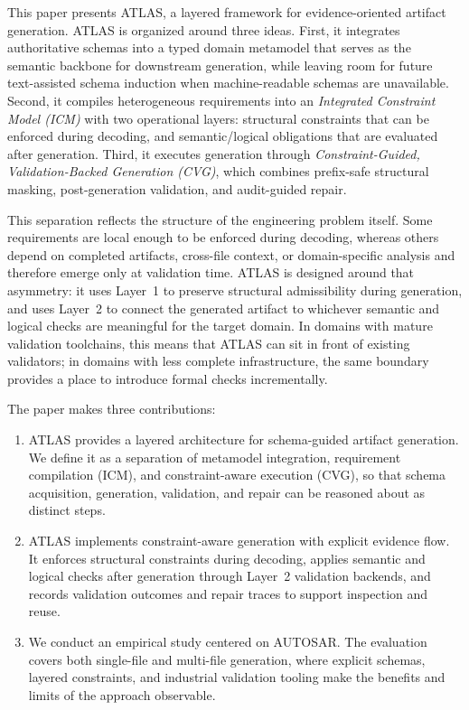 \documentclass[acmlarge,nonacm]{acmart}
\theoremstyle{acmplain}
\theoremstyle{acmdefinition}
\begin{document}
This paper presents ATLAS, a layered framework for evidence-oriented artifact generation. ATLAS is organized around three ideas. First, it integrates authoritative schemas into a typed domain metamodel that serves as the semantic backbone for downstream generation, while leaving room for future text-assisted schema induction when machine-readable schemas are unavailable. Second, it compiles heterogeneous requirements into an \emph{Integrated Constraint Model (ICM)} with two operational layers: structural constraints that can be enforced during decoding, and semantic/logical obligations that are evaluated after generation. Third, it executes generation through \emph{Constraint-Guided, Validation-Backed Generation (CVG)}, which combines prefix-safe structural masking, post-generation validation, and audit-guided repair.

This separation reflects the structure of the engineering problem itself. Some requirements are local enough to be enforced during decoding, whereas others depend on completed artifacts, cross-file context, or domain-specific analysis and therefore emerge only at validation time. ATLAS is designed around that asymmetry: it uses Layer~1 to preserve structural admissibility during generation, and uses Layer~2 to connect the generated artifact to whichever semantic and logical checks are meaningful for the target domain. In domains with mature validation toolchains, this means that ATLAS can sit in front of existing validators; in domains with less complete infrastructure, the same boundary provides a place to introduce formal checks incrementally.

The paper makes three contributions:
\begin{enumerate}[leftmargin=*,itemsep=0.4ex]
    \item ATLAS provides a layered architecture for schema-guided artifact generation. We define it as a separation of metamodel integration, requirement compilation (ICM), and constraint-aware execution (CVG), so that schema acquisition, generation, validation, and repair can be reasoned about as distinct steps.
    \item ATLAS implements constraint-aware generation with explicit evidence flow. It enforces structural constraints during decoding, applies semantic and logical checks after generation through Layer~2 validation backends, and records validation outcomes and repair traces to support inspection and reuse.
    \item We conduct an empirical study centered on AUTOSAR. The evaluation covers both single-file and multi-file generation, where explicit schemas, layered constraints, and industrial validation tooling make the benefits and limits of the approach observable.
\end{enumerate}
\end{document}

